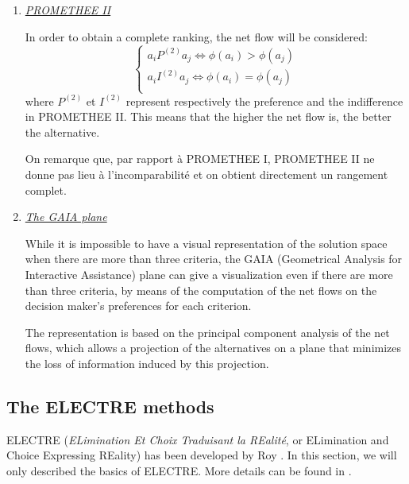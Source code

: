 \begin{enumerate}
\item \textit{\underline{PROMETHEE II}}

In order to obtain a complete ranking, the net flow will be considered:
\begin{equation}
\begin{cases}
a_iP^{(2)}a_j \Leftrightarrow \phi(a_i) > \phi(a_j)\\
a_iI^{(2)}a_j \Leftrightarrow \phi(a_i) = \phi(a_j)\\
\end{cases}
\end{equation}
where $P^{(2)}$ et $I^{(2)}$ represent respectively the preference and the indifference in PROMETHEE II. This means that the higher the net flow is, the better the alternative.

On remarque que, par rapport à PROMETHEE I, PROMETHEE II ne donne pas lieu à l'incomparabilité et on obtient directement un rangement complet.

\item \textit{\underline{The GAIA plane}}

While it is impossible to have a visual representation of the solution space when there are more than three criteria, the GAIA (Geometrical Analysis for Interactive Assistance) plane can give a visualization even if there are more than three criteria, by means of the computation of the net flows on the decision maker's preferences for each criterion.

The representation is based on the principal component analysis of the net flows, which allows a projection of the alternatives on a plane that minimizes the loss of information induced by this projection.
\end{enumerate}

\subsection{The ELECTRE methods}
ELECTRE (\textit{ELimination Et Choix Traduisant la REalité}, or ELimination and Choice Expressing REality) has been developed by Roy \cite{Roy66}. In this section, we will only described the basics of ELECTRE. More details can be found in \cite{electre}.

